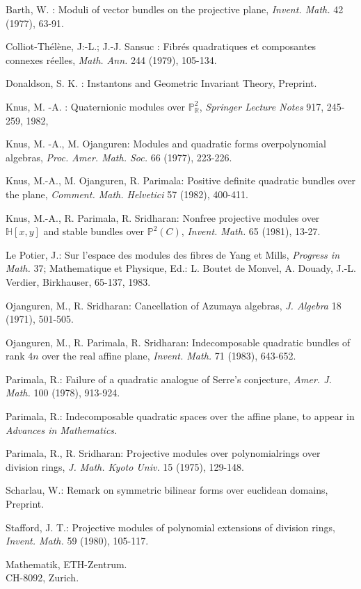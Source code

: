 \begin{thebibliography}{}
 Barth, W. : Moduli of vector bundles on the
projective plane, {\em Invent. Math.} 42 (1977), 63-91.


 Colliot-Th\'el\`ene, J:-L.; J.-J. Sansuc :
Fibr\'es quadratiques et composantes connexes r\'eelles, {\em
Math. Ann.} 244 (1979), 105-134.

 Donaldson, S. K. : Instantons and Geometric
Invariant Theory, Preprint.

 Knus, M. -A. : Quaternionic modules over
$\mathbb{P}^{2}_{\mathbb{R}}$, {\em Springer Lecture Notes} 917,
245-259, 1982,

 Knus, M. -A., M. Ojanguren: Modules and quadratic
forms over\pageoriginale polynomial algebras, {\em
Proc. Amer. Math. Soc.} 66 (1977), 223-226.

 Knus, M.-A., M. Ojanguren, R. Parimala: Positive
definite quadratic bundles over the plane, {\em
Comment. Math. Helvetici} 57 (1982), 400-411.

 Knus, M.-A., R. Parimala, R. Sridharan: Nonfree
projective modules over $\mathbb{H}[x,y]$ and stable bundles over
$\mathbb{P}^{2}(C)$, {\em Invent. Math.} 65 (1981), 13-27.
  
 Le Potier, J.: Sur l'espace des modules des
fibres de Yang et Mills, {\em Progress in Math.} 37; Mathematique et
Physique, Ed.: L. Boutet de Monvel, A. Douady, J.-L. Verdier,
Birkhauser, 65-137, 1983.

 Ojanguren, M., R. Sridharan: Cancellation of
Azumaya algebras, {\em J. Algebra} 18 (1971), 501-505.

 Ojanguren, M., R. Parimala, R. Sridharan:
Indecomposable quadratic bundles of rank $4n$ over the real affine
plane, {\em Invent. Math.} 71 (1983), 643-652.

 Parimala, R.: Failure of a quadratic analogue of
Serre's conjecture, {\em Amer. J. Math.} 100 (1978), 913-924.

 Parimala, R.: Indecomposable quadratic spaces
over the affine plane, to appear in {\em Advances in Mathematics.}

 Parimala, R., R. Sridharan: Projective modules
over polynomial\pageoriginale rings over division rings, {\em
J. Math. Kyoto Univ.} 15 (1975), 129-148.

 Scharlau, W.: Remark on symmetric bilinear forms
over euclidean domains, Preprint.

 Stafford, J. T.: Projective modules of
polynomial extensions of division rings, {\em Invent. Math.} 59
(1980), 105-117.
\end{thebibliography}

\vskip 1cm

\noindent
Mathematik, ETH-Zentrum.\\
CH-8092, Zurich.

\newpage

~\phantom{a}
\thispagestyle{empty}

